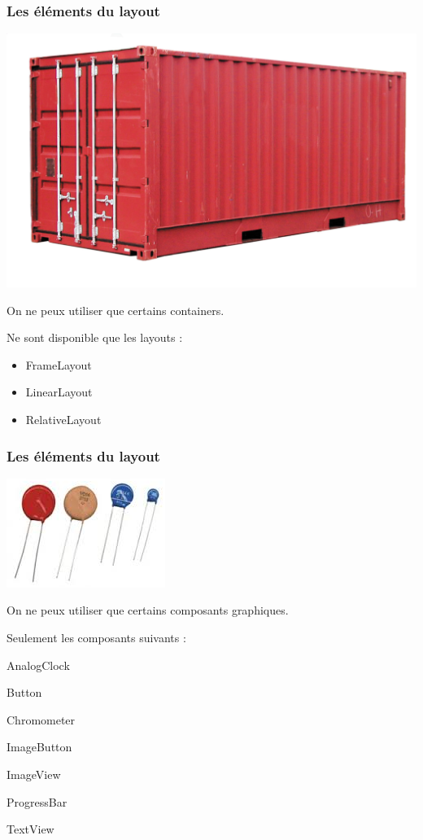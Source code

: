 \documentclass{beamer}
\begin{document}
\begin{frame}
\frametitle{Les éléments du layout}
\begin{center}
\includegraphics[scale=0.2]{container.jpg}
\end{center}
On ne peux utiliser que certains containers.
\begin{block}{Ne sont disponible que les layouts :}
\begin{itemize}
\item FrameLayout
\item LinearLayout
\item RelativeLayout
\end{itemize}
\end{block}
\end{frame}

\begin{frame}
\frametitle{Les éléments du layout}
\begin{center}
\includegraphics[scale=0.5]{comps.png}
\end{center}
On ne peux utiliser que certains composants graphiques.
\begin{block}{Seulement les composants suivants :}
\begin{itemize}
\begin{minipage}[t]{0.4\linewidth}
\item AnalogClock
\item Button
\item Chromometer
\item ImageButton
\end{minipage}
\begin{minipage}[t]{0.4\linewidth}
\item ImageView
\item ProgressBar
\item TextView
\end{minipage}
\end{itemize}
\end{block}
\end{frame}
\end{document}

